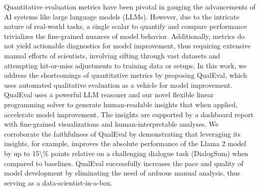Quantitative evaluation metrics have been pivotal in gauging the advancements of AI systems like large language models (LLMs). However, due to the intricate nature of real-world tasks, a single scalar to quantify and compare performance trivializes the fine-grained nuances of model behavior. Additionally, metrics do not yield actionable diagnostics for model improvement, thus requiring extensive manual efforts of scientists, involving sifting through vast datasets and attempting hit-or-miss adjustments to training data or setups. In this work, we address the shortcomings of quantitative metrics by proposing QualEval, which uses automated qualitative evaluation as a vehicle for model improvement. QualEval uses a powerful LLM reasoner and our novel flexible linear programming solver to generate human-readable insights that when applied, accelerate model improvement. The insights are supported by a dashboard report with fine-grained visualizations and human-interpretable analyses. We corroborate the faithfulness of QualEval by demonstrating that leveraging its insights, for example, improves the absolute performance of the Llama 2 model by up to 15\textbackslash{}\% points relative on a challenging dialogue task (DialogSum) when compared to baselines. QualEval successfully increases the pace and quality of model development by eliminating the need of arduous manual analysis, thus serving as a data-scientist-in-a-box.